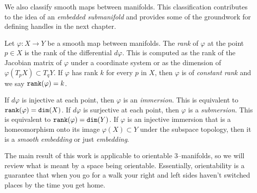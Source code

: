 We also classify smooth maps between manifolds.
This classification contributes to the idea of an \emph{embedded submanifold} and provides some of the groundwork for defining handles in the next chapter.

\begin{defn}
	Let $\varphi:X\to Y$ be a smooth map between manifolds.
	The \emph{rank} of $\varphi$ at the point $p\in X$ is the rank of the differential $d\varphi$.
	This is computed as the rank of the Jacobian matrix of $\varphi$ under a coordinate system or as the dimension of $\varphi(T_p X)\subset T_q Y$.
	If $\varphi$ has rank $k$ for every $p$ in $X$, then $\varphi$ is of \emph{constant rank} and we say $\texttt{rank}(\varphi)=k$.
	
	If $d\varphi$ is injective at each point, then $\varphi$ is an \emph{immersion}.
	This is equivalent to $\texttt{rank}(\varphi)=\texttt{dim}(X)$.
	If $d\varphi$ is surjective at each point, then $\varphi$ is a \emph{submersion}.
	This is equivalent to $\texttt{rank}(\varphi)=\texttt{dim}(Y)$.
	If $\varphi$ is an injective immersion that is a homeomorphism onto its image $\varphi(X)\subset Y$ under the subspace topology, then it is a \emph{smooth embedding} or just \emph{embedding}.
\end{defn}



The main result of this work is applicable to orientable 3--manifolds, so we will review what is meant by a space being orientable.
Essentially, orientability is a guarantee that when you go for a walk your right and left sides haven't switched places by the time you get home.

